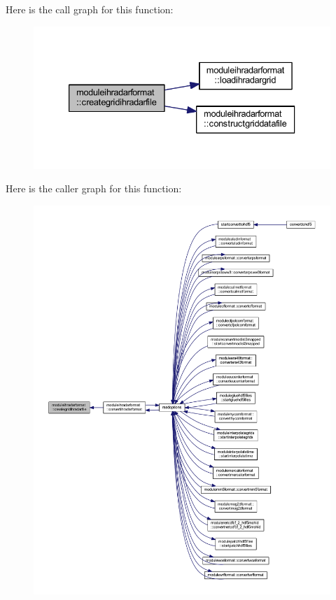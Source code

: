Here is the call graph for this function\+:\nopagebreak
\begin{figure}[H]
\begin{center}
\leavevmode
\includegraphics[width=333pt]{namespacemoduleihradarformat_ada390827dfd90ffece67dfc0ddc1a1af_cgraph}
\end{center}
\end{figure}
Here is the caller graph for this function\+:\nopagebreak
\begin{figure}[H]
\begin{center}
\leavevmode
\includegraphics[width=350pt]{namespacemoduleihradarformat_ada390827dfd90ffece67dfc0ddc1a1af_icgraph}
\end{center}
\end{figure}
\mbox{\label{namespacemoduleihradarformat_af1f8f7e2cf6ebd67fd284bbb39a55018}} 
